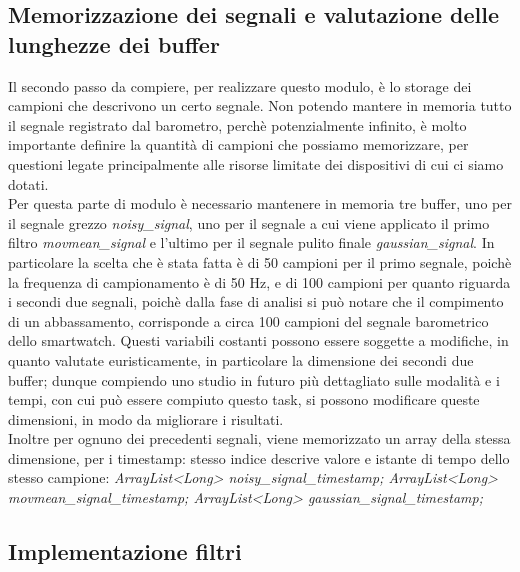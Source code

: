 \documentclass[a4paper, oneside]{book}
\begin{document}
\subsection{Memorizzazione dei segnali e valutazione delle lunghezze dei buffer}
Il secondo passo da compiere, per realizzare questo modulo, è lo storage dei campioni che descrivono un certo segnale. Non potendo mantere in memoria tutto il segnale registrato dal barometro, perchè potenzialmente infinito, è molto importante definire la quantità di campioni che possiamo memorizzare, per questioni legate principalmente alle risorse limitate dei dispositivi di cui ci siamo dotati. \\
Per questa parte di modulo è necessario mantenere in memoria tre buffer, uno per il segnale grezzo \textit{noisy\_signal}, uno per il segnale a cui viene applicato il primo filtro \textit{movmean\_signal} e l'ultimo per il segnale pulito finale \textit{gaussian\_signal}. In particolare la scelta che è stata fatta è di 50 campioni per il primo segnale, poichè la frequenza di campionamento è di 50 Hz, e di 100 campioni per quanto riguarda i secondi due segnali, poichè dalla fase di analisi si può notare che il compimento di un abbassamento, corrisponde a circa 100 campioni del segnale barometrico dello smartwatch. Questi variabili costanti possono essere soggette a modifiche, in quanto valutate euristicamente, in particolare la dimensione dei secondi due buffer; dunque compiendo uno studio in futuro più dettagliato sulle modalità e i tempi, con cui può essere compiuto questo task, si possono modificare queste dimensioni, in modo da migliorare i risultati. \\
 
\vspace{3mm}
Inoltre per ognuno dei precedenti segnali, viene memorizzato un array della stessa dimensione, per i timestamp: stesso indice descrive valore e istante di tempo dello stesso campione: \textit{ArrayList<Long> noisy\_signal\_timestamp; ArrayList<Long> movmean\_signal\_timestamp; ArrayList<Long> gaussian\_signal\_timestamp;}

\subsection{Implementazione filtri}
\vspace{2mm}

\vspace{5mm}
\end{document}
